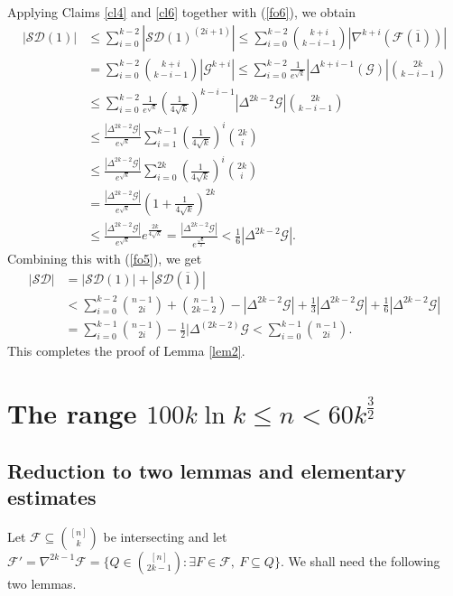 \documentclass[11pt]{article}
\numberwithin{equation}{section}
\begin{document}
Applying  Claims \ref{cl4} and  \ref{cl6} together with (\ref{fo6}), we obtain
\begin{align*}
|\mathcal{SD}(1)|&\le \sum\limits_{i=0}^{k-2}|\mathcal{SD}(1)^{(2i+1)}|
\le \sum\limits_{i=0}^{k-2}\binom{k+i}{k-i-1}|\nabla^{k+i}(\mathcal{F}(\overline{1}))|\\
&=\sum\limits_{i=0}^{k-2}\binom{k+i}{k-i-1}|\mathcal{G}^{k+i}|
\le\sum\limits_{i=0}^{k-2}\frac{1}{e^{\sqrt{k}}}|\Delta^{k+i-1}(\mathcal{G})|\binom{2k}{k-i-1}\\
&\le \sum\limits_{i=0}^{k-2}\frac{1}{e^{\sqrt{k}}}\left( \frac{1}{4\sqrt{k}} \right)^{k-i-1}|\Delta^{2k-2} \mathcal{G}|\binom{2k}{k-i-1}\\
&\le \frac{|\Delta^{2k-2} \mathcal{G}|}{e^{\sqrt{k}}}\sum\limits_{i=1}^{k-1}{\left( \frac{1}{4\sqrt{k}}\right)}^i\binom{2k}{i}\\
&\le\frac{|\Delta^{2k-2} \mathcal{G}|}{e^{\sqrt{k}}}\sum\limits_{i=0}^{2k}{\left( \frac{1}{4\sqrt{k}}\right)}^i\binom{2k}{i}\\
	&=\frac{|\Delta^{2k-2} \mathcal{G}|}{e^{\sqrt{k}}}\left(1+\frac{1}{4\sqrt{k}} \right)^{2k}\\
&\le\frac{|\Delta^{2k-2} \mathcal{G}|}{e^{\sqrt{k}}}e^{\frac{2k}{4\sqrt{k}}}
= \frac{|\Delta^{2k-2} \mathcal{G}|}{e^{\frac{\sqrt{k}}{2}}}
<\frac{1}{6}|\Delta^{2k-2} \mathcal{G}|.
\end{align*}
Combining this with (\ref{fo5}), we get   
\begin{align*}|\mathcal{SD}|&=|\mathcal{SD}(1)|+|\mathcal{SD}(\overline{1})|\\
&<\sum\limits_{i=0}^{k-2} \binom{n-1}{2i}+\binom{n-1}{2k-2}-|\Delta^{2k-2}{\mathcal{G}}| +\frac{1}{3} |\Delta^{2k-2} \mathcal{G}|+\frac{1}{6} |\Delta^{2k-2} \mathcal{G}|\\
&= \sum_{i=0}^{k-1} \binom{n-1}{2i} - \frac{1}{2} |\Delta^{(2k-2)}\mathcal{G}<  \sum_{i=0}^{k-1} \binom{n-1}{2i}.
\end{align*}
This completes the proof of Lemma \ref{lem2}.

\section{The range $100 k\ln k \le n< 60k^\frac{3}{2}$}\label{se4}


\subsection{Reduction to two lemmas and elementary estimates}
 Let  $\mathcal{F}\subseteq \binom{[n]}{k}$ be intersecting  and let $\mathcal{F}' = \nabla^{2k-1}\mathcal{F}=\{Q\in\binom{[n]}{2k-1} :\exists F \in \mathcal{F}, \ F\subseteq Q\}$. We shall need the following two lemmas.
\end{document}
